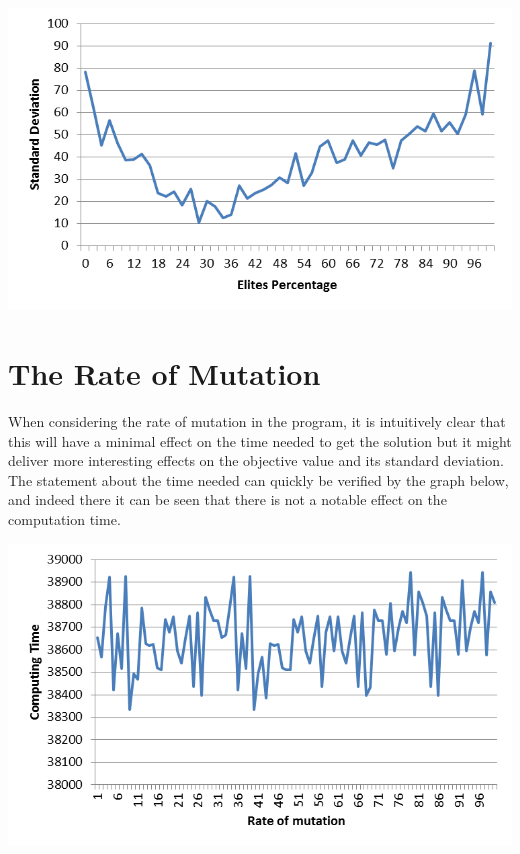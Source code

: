 	\includegraphics[height=8cm]{SDEP}



\section{The Rate of Mutation}
When considering the rate of mutation in the program, it is intuitively clear that this will have a minimal effect on the time needed to get the solution but it might deliver more interesting effects on the objective value and its standard deviation.
The statement about the time needed can quickly be verified by the graph below, and indeed there it can be seen that there is not a notable effect on the computation time.
\par
\begin{centering}
		\includegraphics[height=8cm]{CTRM}
\end{centering}



